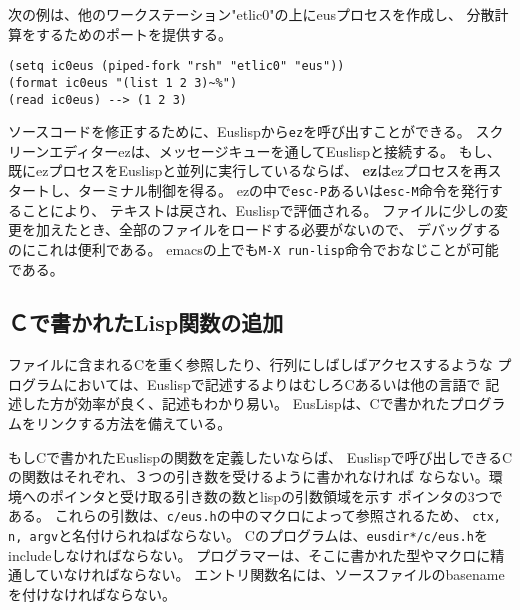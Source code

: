 次の例は、他のワークステーション"etlic0"の上にeusプロセスを作成し、
分散計算をするためのポートを提供する。

\begin{verbatim}
(setq ic0eus (piped-fork "rsh" "etlic0" "eus"))
(format ic0eus "(list 1 2 3)~%")
(read ic0eus) --> (1 2 3)
\end{verbatim}

ソースコードを修正するために、Euslispから{\tt ez}を呼び出すことができる。
スクリーンエディターezは、メッセージキューを通してEuslispと接続する。
もし、既にezプロセスをEuslispと並列に実行しているならば、
{\bf ez}はezプロセスを再スタートし、ターミナル制御を得る。
ezの中で{\tt esc-P}あるいは{\tt esc-M}命令を発行することにより、
テキストは戻され、Euslispで評価される。
ファイルに少しの変更を加えたとき、全部のファイルをロードする必要がないので、
デバッグするのにこれは便利である。
emacsの上でも{\tt M-X run-lisp}命令でおなじことが可能である。

\begin{refdesc}



\end{refdesc}

\newpage

\subsection{Ｃで書かれたLisp関数の追加}

ファイルに含まれるCを重く参照したり、行列にしばしばアクセスするような
プログラムにおいては、Euslispで記述するよりはむしろCあるいは他の言語で
記述した方が効率が良く、記述もわかり易い。
EusLispは、Cで書かれたプログラムをリンクする方法を備えている。

もしCで書かれたEuslispの関数を定義したいならば、
Euslispで呼び出しできるCの関数はそれぞれ、３つの引き数を受けるように書かれなければ
ならない。環境へのポインタと受け取る引き数の数とlispの引数領域を示す
ポインタの3つである。
これらの引数は、{\tt c/eus.h}の中のマクロによって参照されるため、
{\tt ctx, n, argv}と名付けられねばならない。
Cのプログラムは、{\tt *eusdir*/c/eus.h}をincludeしなければならない。
プログラマーは、そこに書かれた型やマクロに精通していなければならない。
エントリ関数名には、ソースファイルのbasenameを付けなければならない。

